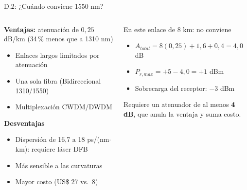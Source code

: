 \documentclass[aspectratio=1610]{beamer}
\begin{document}
\begin{frame}{D.2: ¿Cuándo conviene 1550 nm?}
  \begin{columns}[T]
    \begin{column}{0.5\textwidth}
      \textbf{Ventajas:} atenuación de $0{,}25$ dB/km (34\,\% menos que a 1310 nm)
      \begin{itemize}
        \item Enlaces largos limitados por atenuación
        \item Una sola fibra (Bidireccional 1310/1550)
        \item Multiplexación CWDM/DWDM
      \end{itemize}
      \textbf{Desventajas}
      \begin{itemize}
        \item Dispersión de 16,7 a 18 ps/(nm$\cdot$km): requiere láser DFB
        \item Más sensible a las curvaturas
        \item Mayor costo (US\$ 27 vs.\ 8)
      \end{itemize}
    \end{column}
    \begin{column}{0.5\textwidth}
      \begin{block}{En este enlace de 8 km: no conviene}
        \begin{itemize}
          \item $A_{total} = 8(0{,}25) + 1{,}6 + 0{,}4 = 4{,}0$ dB
          \item $P_{r,max} = +5 - 4{,}0 = +1$ dBm
          \item Sobrecarga del receptor: $-3$ dBm
        \end{itemize}
        Requiere un atenuador de al menos \textbf{4 dB}, que anula la ventaja y suma costo.
      \end{block}
    \end{column}
  \end{columns}
\end{frame}
\end{document}
